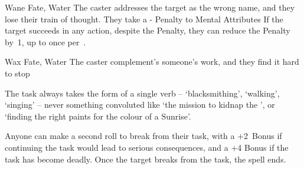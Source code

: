 \ifodd\value{diceNo}

  {}%
  {Wane}%
  {Fate, Water}%
  {}%
  {The caster addresses the target as the wrong name, and they lose their train of thought.
    They take a - Penalty to Mental Attributes}%
  {If the target succeeds in any action, despite the Penalty, they can reduce the Penalty by~1, up to once per~.}

\else

  {}%
  {Wax}%
  {Fate, Water}%
  {}%
  {The caster complement's someone's work, and they find it hard to stop}%
  {The task always takes the form of a single verb -- `blacksmithing', `walking', `singing' -- never something convoluted like `the mission to kidnap the ', or `finding the right paints for the colour of a Sunrise'.

    Anyone can make a second roll to break from their task, with a +2~Bonus if continuing the task  would lead to serious consequences, and a +4 Bonus if the task has become deadly.
	Once the target breaks from the task, the spell ends.}

\fi
{}
